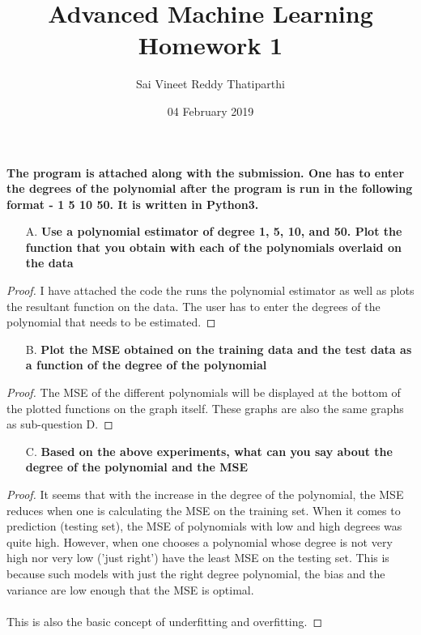\documentclass{article}
\date{04 February 2019}
\theoremstyle{case}
\begin{document}
\author{Sai Vineet Reddy Thatiparthi}

 \title{%
  Advanced Machine Learning \\
  \large Homework 1}
\maketitle
\textbf{The program is attached along with the submission. One has to enter the degrees of the polynomial after the program is run in the following format - 1 5 10 50. It is written in Python3.}
\begin{enumerate}
    \item [A.] \textbf{Use a polynomial estimator of degree 1, 5, 10, and 50. Plot the
function that you obtain with each of the polynomials overlaid on
the data}
\end{enumerate} 
\begin{proof} 
I have attached the code the runs the polynomial estimator as well as plots the resultant function on the data. The user has to enter the degrees of the polynomial that needs to be estimated.
\end{proof}

\begin{enumerate}
    \item [B.] \textbf{Plot the MSE obtained on the training data and the test data as
a function of the degree of the polynomial}
\end{enumerate}
\begin{proof}
The MSE of the different polynomials will be displayed at the bottom of the plotted functions on the graph itself. These graphs are also the same graphs as sub-question D.

\end{proof}
\begin{enumerate}
    \item [C.] \textbf{Based on the above experiments, what can you say about the
degree of the polynomial and the MSE}
\end{enumerate} 
\begin{proof} 
It seems that with the increase in the degree of the polynomial, the MSE reduces when one is calculating the MSE on the training set. When it comes to prediction (testing set), the MSE of polynomials with low and high degrees was quite high. However, when one chooses a polynomial whose degree is not very high nor very low ('just right') have the least MSE on the testing set. This is because such models with just the right degree polynomial, the bias and the variance are low enough that the MSE is optimal. \\ \\
This is also the basic concept of underfitting and overfitting.
\end{proof}
\end{document}

